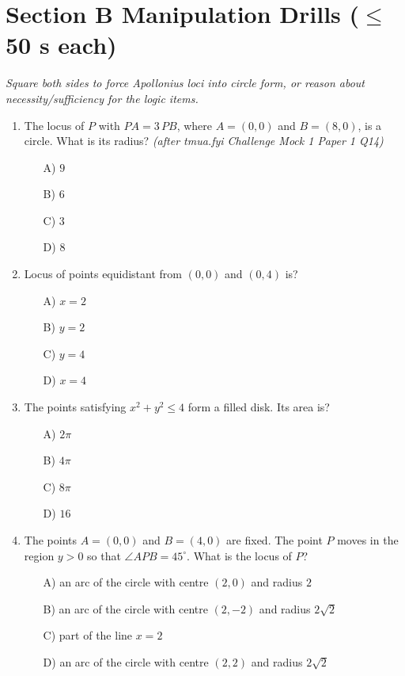 \documentclass[11pt,a4paper]{article}
\begin{document}
\section*{Section B \quad Manipulation Drills \hfill{\normalfont\small($\leq$50 s each)}}

\noindent\textit{Square both sides to force Apollonius loci into circle form, or reason about necessity/sufficiency for the logic items.}

\begin{enumerate}

\item The locus of $P$ with $PA=3\,PB$, where $A=(0,0)$ and $B=(8,0)$, is a circle. What is its radius? \textit{\small(after tmua.fyi Challenge Mock 1 Paper 1 Q14)}
\begin{itemize}
\item[A)] $9$
\item[B)] $6$
\item[C)] $3$
\item[D)] $8$
\end{itemize}

\item Locus of points equidistant from $(0,0)$ and $(0,4)$ is?
\begin{itemize}
\item[A)] $x=2$
\item[B)] $y=2$
\item[C)] $y=4$
\item[D)] $x=4$
\end{itemize}

\item The points satisfying $x^2+y^2 \le 4$ form a filled disk. Its area is?
\begin{itemize}
\item[A)] $2\pi$
\item[B)] $4\pi$
\item[C)] $8\pi$
\item[D)] $16$
\end{itemize}

\item The points $A=(0,0)$ and $B=(4,0)$ are fixed. The point $P$ moves in the region $y>0$ so that $\angle APB=45^\circ$. What is the locus of $P$?
\begin{itemize}
\item[A)] an arc of the circle with centre $(2,0)$ and radius $2$
\item[B)] an arc of the circle with centre $(2,-2)$ and radius $2\sqrt2$
\item[C)] part of the line $x=2$
\item[D)] an arc of the circle with centre $(2,2)$ and radius $2\sqrt2$
\end{itemize}


\end{enumerate}
\end{document}
